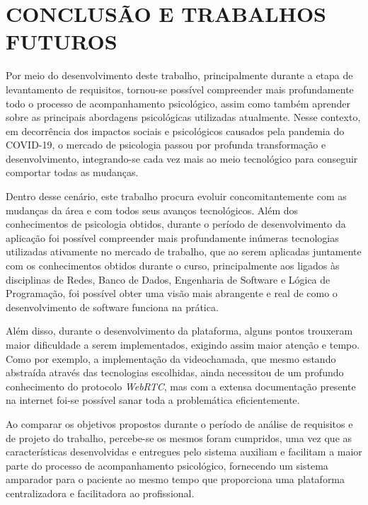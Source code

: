\chapter{CONCLUSÃO E TRABALHOS FUTUROS}
\label{chap:conclusao}

Por meio do desenvolvimento deste trabalho, principalmente durante a etapa de levantamento de requisitos, tornou-se possível compreender mais profundamente todo o processo de acompanhamento psicológico, assim como também aprender sobre as principais abordagens psicológicas utilizadas atualmente. Nesse contexto, em decorrência dos impactos sociais e psicológicos causados pela pandemia do COVID-19, o mercado de psicologia passou por profunda transformação e desenvolvimento, integrando-se cada vez mais ao meio tecnológico para conseguir comportar todas as mudanças.

Dentro desse cenário, este trabalho procura evoluir concomitantemente com as mudanças da área e com todos seus avanços tecnológicos. Além dos conhecimentos de psicologia obtidos, durante o período de desenvolvimento da aplicação foi possível compreender mais profundamente inúmeras tecnologias utilizadas ativamente no mercado de trabalho, que ao serem aplicadas juntamente com os conhecimentos obtidos durante o curso, principalmente aos ligados às disciplinas de Redes, Banco de Dados, Engenharia de Software e Lógica de Programação, foi possível obter uma visão mais abrangente e real de como o desenvolvimento de software funciona na prática.

Além disso, durante o desenvolvimento da plataforma, alguns pontos trouxeram maior dificuldade a serem implementados, exigindo assim maior atenção e tempo. Como por exemplo, a implementação da videochamada, que mesmo estando abstraída através das tecnologias escolhidas, ainda necessitou de um profundo conhecimento do protocolo \textit{WebRTC},  mas com a extensa documentação presente na internet foi-se possível sanar toda a problemática eficientemente.

Ao comparar os objetivos propostos durante o período de análise de requisitos e de projeto do trabalho, percebe-se os mesmos foram cumpridos, uma vez que as características desenvolvidas e entregues pelo sistema auxiliam e facilitam a maior parte do processo de acompanhamento psicológico, fornecendo um sistema amparador para o paciente ao mesmo tempo que proporciona uma plataforma centralizadora e facilitadora ao profissional.

